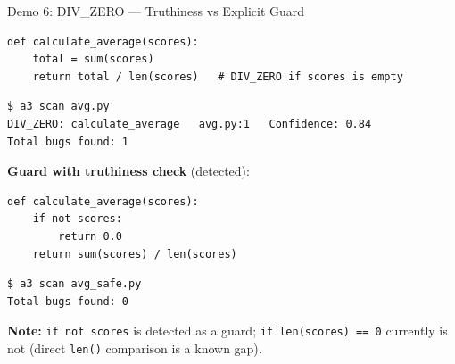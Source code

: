 \documentclass[aspectratio=169]{beamer}
\begin{document}
\begin{frame}[fragile]{Demo 6: DIV\_ZERO --- Truthiness vs Explicit Guard}

\begin{lstlisting}
def calculate_average(scores):
    total = sum(scores)
    return total / len(scores)   # DIV_ZERO if scores is empty
\end{lstlisting}

\begin{lstlisting}[style=bash]
$ a3 scan avg.py
DIV_ZERO: calculate_average   avg.py:1   Confidence: 0.84
Total bugs found: 1
\end{lstlisting}

\vspace{0.3em}
\textbf{Guard with truthiness check} (detected):
\begin{lstlisting}
def calculate_average(scores):
    if not scores:
        return 0.0
    return sum(scores) / len(scores)
\end{lstlisting}
\vspace{-0.3em}
\begin{lstlisting}[style=bash]
$ a3 scan avg_safe.py
Total bugs found: 0
\end{lstlisting}

\textbf{Note:} \texttt{if not scores} is detected as a guard; \texttt{if len(scores) == 0} currently is not (direct \texttt{len()} comparison is a known gap).

\end{frame}
\end{document}
